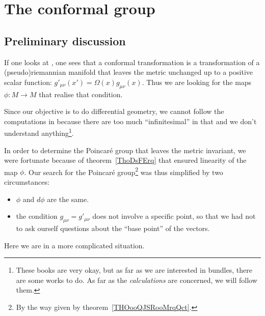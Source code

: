 
\section{The conformal group}

\subsection{Preliminary discussion}

If one looks at \cite{ooIYOHooMRMfXl,ooDPRUooOFPyPH}, one sees that a conformal transformation is a transformation of a (pseudo)riemannian manifold that leaves the metric unchanged up to a positive scalar function: \( g'_{\mu\nu}(x')=\Omega(x)g_{\mu\nu}(x)\). Thus we are looking for the maps \( \phi\colon M\to M\) that realise that condition.

Since our objective is to do differential geometry, we cannot follow the computations in \cite{ooIYOHooMRMfXl,ooDPRUooOFPyPH} because there are too much ``infinitesimal'' in that and we don't understand anything\footnote{These books are very okay, but as far as we are interested in bundles, there are some works to do. As far as the \emph{calculations} are concerned, we will follow them.}.

In order to determine the Poincaré group that leaves the metric invariant, we were fortunate because of theorem~\ref{ThoDsFErq} that ensured linearity of the map \( \phi\). Our search for the Poincaré group\footnote{By the way given by theorem~\ref{THOooQJSRooMrqQct}.} was thus simplified by two circumstances:
\begin{itemize}
	\item \( \phi\) and \( d\phi\) are the same.
	\item the condition \( g_{\mu\nu}=g'_{\mu\nu}\) does not involve a specific point, so that we had not to ask ourself questions about the ``base point'' of the vectors.
\end{itemize}
Here we are in a more complicated situation.

